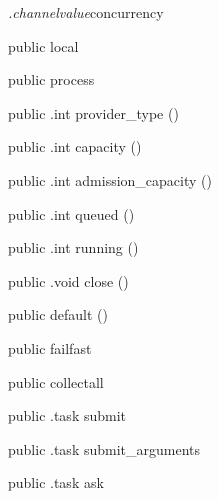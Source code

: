 \begin{CrexxClass}{\textit{.channelvalue}}{concurrency}

  \begin{Hierarchy}
  \end{Hierarchy}

  \begin{Members}

    \Factory
      {public}
      {local}
      {}

    \Factory
      {public}
      {process}
      {}

    \Method
      {public}
      {.int}
      {provider\_type}
      {()}

    \Method
      {public}
      {.int}
      {capacity}
      {()}

    \Method
      {public}
      {.int}
      {admission\_capacity}
      {()}

    \Method
      {public}
      {.int}
      {queued}
      {()}

    \Method
      {public}
      {.int}
      {running}
      {()}

    \Method
      {public}
      {.void}
      {close}
      {()}

    \Factory
      {public}
      {default}
      {()}

    \Factory
      {public}
      {failfast}
      {}

    \Factory
      {public}
      {collectall}
      {}

    \Method
      {public}
      {.task}
      {submit}
      {}

    \Method
      {public}
      {.task}
      {submit\_arguments}
      {}

    \Method
      {public}
      {.task}
      {ask}
      {}


\end{Members}
\end{CrexxClass}
